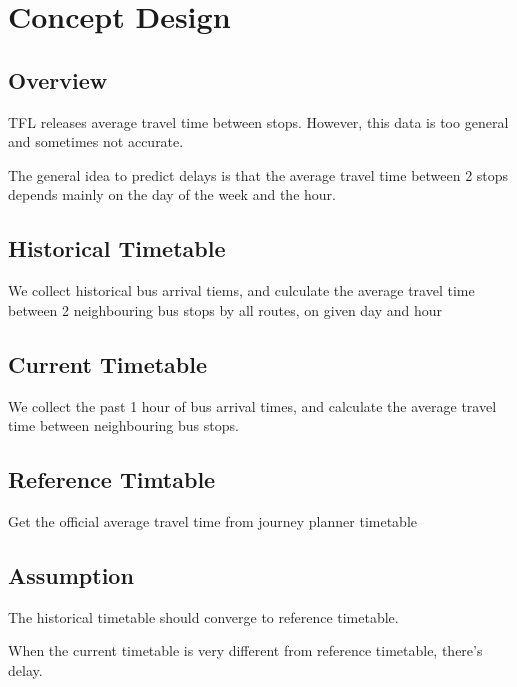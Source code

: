 \chapter{Concept Design}
\section{Overview}
\par TFL releases average travel time between stops. However, this data is too general and sometimes not accurate.

\par The general idea to predict delays is that the average travel time between 2 stops depends mainly on the day of the week and the hour.

\section{Historical Timetable}
\par We collect historical bus arrival tiems, and culculate the average travel time between 2 neighbouring bus stops by all routes, on given day and hour

\section{Current Timetable}
\par We collect the past 1 hour of bus arrival times, and calculate the average travel time between neighbouring bus stops.

\section{Reference Timtable}
\par Get the official average travel time from journey planner timetable

\section{Assumption}
\par The historical timetable should converge to reference timetable.

\par When the current timetable is very different from reference timetable, there's delay.
